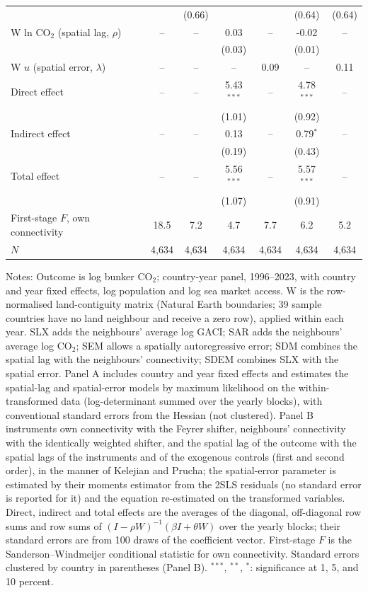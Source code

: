 \begin{table}[htbp]
\begin{threeparttable}
\begin{tabular}{lcccccc}
   &  & (0.66) &  &  & (0.64) & (0.64) \\
  W ln CO$_2$ (spatial lag, $\rho$) & -- & -- & 0.03 & -- & -0.02 & -- \\
   &  &  & (0.03) &  & (0.01) &  \\
  W $u$ (spatial error, $\lambda$) & -- & -- & -- & 0.09 & -- & 0.11 \\
  Direct effect & -- & -- & 5.43$^{***}$ & -- & 4.78$^{***}$ & -- \\
   &  &  & (1.01) &  & (0.92) &  \\
  Indirect effect & -- & -- & 0.13 & -- & 0.79$^{*}$ & -- \\
   &  &  & (0.19) &  & (0.43) &  \\
  Total effect & -- & -- & 5.56$^{***}$ & -- & 5.57$^{***}$ & -- \\
   &  &  & (1.07) &  & (0.91) &  \\
  First-stage $F$, own connectivity & 18.5 & 7.2 & 4.7 & 7.7 & 6.2 & 5.2 \\
  $N$ & 4,634 & 4,634 & 4,634 & 4,634 & 4,634 & 4,634 \\
\bottomrule
\end{tabular}
\begin{tablenotes}[flushleft]
\footnotesize
\item Notes: Outcome is log bunker CO$_2$; country-year panel, 1996--2023, with country and year fixed effects, log population and log sea market access. W is the row-normalised land-contiguity matrix (Natural Earth boundaries; 39 sample countries have no land neighbour and receive a zero row), applied within each year. SLX adds the neighbours' average log GACI; SAR adds the neighbours' average log CO$_2$; SEM allows a spatially autoregressive error; SDM combines the spatial lag with the neighbours' connectivity; SDEM combines SLX with the spatial error. Panel A includes country and year fixed effects and estimates the spatial-lag and spatial-error models by maximum likelihood on the within-transformed data (log-determinant summed over the yearly blocks), with conventional standard errors from the Hessian (not clustered). Panel B instruments own connectivity with the Feyrer shifter, neighbours' connectivity with the identically weighted shifter, and the spatial lag of the outcome with the spatial lags of the instruments and of the exogenous controls (first and second order), in the manner of Kelejian and Prucha; the spatial-error parameter is estimated by their moments estimator from the 2SLS residuals (no standard error is reported for it) and the equation re-estimated on the transformed variables. Direct, indirect and total effects are the averages of the diagonal, off-diagonal row sums and row sums of $(I-\rho W)^{-1}(\beta I + \theta W)$ over the yearly blocks; their standard errors are from 100 draws of the coefficient vector. First-stage $F$ is the Sanderson--Windmeijer conditional statistic for own connectivity. Standard errors clustered by country in parentheses (Panel B). $^{***}$, $^{**}$, $^{*}$: significance at 1, 5, and 10 percent.
\end{tablenotes}
\end{threeparttable}
\end{table}

